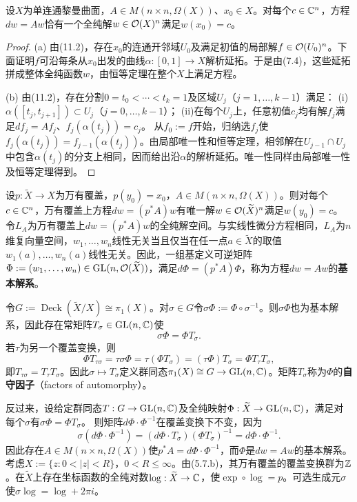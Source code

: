 设$X$为单连通黎曼曲面，$A\in M(n\times n,\Omega(X))$、$x_0\in X$。对每个$c\in\mathbb C^n$，方程$dw=Aw$恰有一个全纯解$w\in\mathcal O(X)^n$满足$w(x_0)=c$。
\begin{proof}
(a) 由(11.2)，存在$x_0$的连通开邻域$U_0$及满足初值的局部解$f\in\mathcal O(U_0)^n$。下面证明$f$可沿每条从$x_0$出发的曲线$\alpha:[0,1]\to X$解析延拓。于是由(7.4)，这些延拓拼成整体全纯函数$w$，由恒等定理在整个$X$上满足方程。

(b) 由(11.2)，存在分割$0=t_0<\cdots<t_k=1$及区域$U_j$（$j=1,\ldots,k-1$）满足：
(i)$\alpha([t_j,t_{j+1}])\subset U_j$（$j=0,\ldots,k-1$）；
(ii)在每个$U_j$上，任意初值$c_j$均有解$f_j$满足$df_j=Af_j$、$f_j(\alpha(t_j))=c_j$。
从$f_0:=f$开始，归纳选$f_j$使$f_j(\alpha(t_j))=f_{j-1}(\alpha(t_j))$。由局部唯一性和恒等定理，相邻解在$U_{j-1}\cap U_j$中包含$\alpha(t_j)$的分支上相同，因而给出沿$\alpha$的解析延拓。唯一性同样由局部唯一性及恒等定理得到。
\end{proof}
设$p:\widetilde X\to X$为万有覆盖，$p(y_0)=x_0$，$A\in M(n\times n,\Omega(X))$。则对每个$c\in\mathbb C^n$，万有覆盖上方程$dw=(p^*A)w$有唯一解$w\in\mathcal O(\widetilde X)^n$满足$w(y_0)=c$。
令$L_A$为万有覆盖上$dw=(p^*A)w$的全纯解空间。与实线性微分方程相同，$L_A$为$n$维复向量空间，$w_1,\ldots,w_n$线性无关当且仅当在任一点$a\in\widetilde X$的取值$w_1(a),\ldots,w_n(a)$线性无关。因此，一组基定义可逆矩阵$\Phi:=(w_1,\ldots,w_n)\in\operatorname{GL}(n,\mathcal O(\widetilde X))$，满足$d\Phi=(p^*A)\Phi$，称为方程$dw=Aw$的\textbf{基本解系}。

令$G:=\operatorname{Deck}(\widetilde X/X)\cong\pi_1(X)$。对$\sigma\in G$令$\sigma\Phi:=\Phi\circ\sigma^{-1}$。则$\sigma\Phi$也为基本解系，因此存在常矩阵$T_\sigma\in\operatorname{GL}(n,\mathbb C)$使
\[
\sigma\Phi=\Phi T_\sigma.
\]
若$\tau$为另一个覆盖变换，则
\[
\Phi T_{\tau\sigma}=\tau\sigma\Phi=\tau(\Phi T_\sigma)=(\tau\Phi)T_\sigma=\Phi T_\tau T_\sigma,
\]
即$T_{\tau\sigma}=T_\tau T_\sigma$。因此$\sigma\mapsto T_\sigma$定义群同态$\pi_1(X)\cong G\to\operatorname{GL}(n,\mathbb C)$。矩阵$T_\sigma$称为$\Phi$的\textbf{自守因子}（factors of automorphy）。

反过来，设给定群同态$T:G\to\operatorname{GL}(n,\mathbb C)$及全纯映射$\Phi:\widetilde X\to\operatorname{GL}(n,\mathbb C)$，满足对每个$\sigma$有$\sigma\Phi=\Phi T_\sigma$。
则矩阵$d\Phi\cdot\Phi^{-1}$在覆盖变换下不变，因为
\[
\sigma(d\Phi\cdot\Phi^{-1})=(d\Phi\cdot T_\sigma)(\Phi T_\sigma)^{-1}=d\Phi\cdot\Phi^{-1}.
\]
因此存在$A\in M(n\times n,\Omega(X))$使$p^*A=d\Phi\cdot\Phi^{-1}$，而$\Phi$是$dw=Aw$的基本解系。
考虑$X:=\{z:0<|z|<R\}$，$0<R\le\infty$。由(5.7.b)，其万有覆盖的覆盖变换群为$\mathbb Z$。在$\widetilde X$上存在坐标函数的全纯对数$\log:\widetilde X\to\mathbb C$，使$\exp\circ\log=p$。可选生成元$\sigma$使$\sigma\log=\log+2\pi i$。

